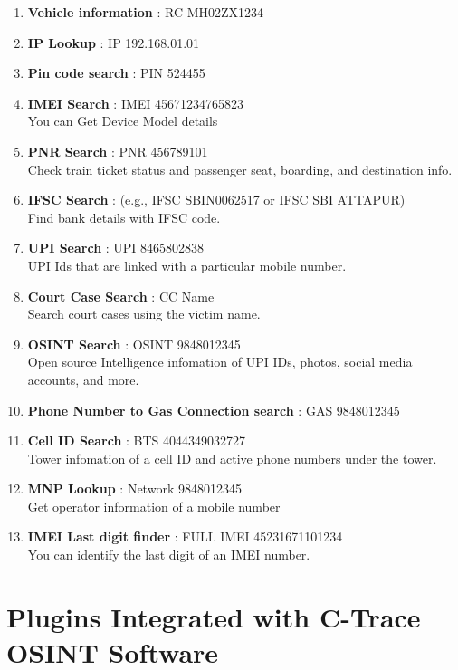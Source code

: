 \begin{enumerate}[label=\textbf{\roman*.}]
    \item \textbf{Vehicle information} : RC MH02ZX1234
    \item \textbf{IP Lookup} : IP 192.168.01.01
    \item \textbf{Pin code search} : PIN 524455
    \item \textbf{IMEI Search} : IMEI 45671234765823 \\
        You can Get Device Model details
    \item \textbf{PNR Search} : PNR 456789101 \\
        Check train ticket status and passenger seat, boarding, and destination info.
    \item \textbf{IFSC Search} : (e.g., IFSC SBIN0062517 or IFSC SBI ATTAPUR) \\
        Find bank details with IFSC code.
    \item \textbf{UPI Search} : UPI 8465802838 \\
        UPI Ids that are linked with a particular mobile number.
    \item \textbf{Court Case Search} : CC Name \\
        Search court cases using the victim name.
    \item \textbf{OSINT Search} : OSINT 9848012345 \\
        Open source Intelligence infomation of UPI IDs, photos, social media accounts, and more.
    \item \textbf{Phone Number to Gas Connection search} : GAS 9848012345
    \item \textbf{Cell ID Search} : BTS 4044349032727 \\
        Tower infomation of a cell ID and active phone numbers under the tower.
    \item \textbf{MNP Lookup} : Network 9848012345 \\
        Get operator information of a mobile number
    \item \textbf{IMEI Last digit finder} : FULL IMEI 45231671101234 \\
        You can identify the last digit of an IMEI number.
\end{enumerate}

\section{Plugins Integrated with C-Trace OSINT Software}\label{sec:plugins-integrated-with-c-trace-osint-software}

